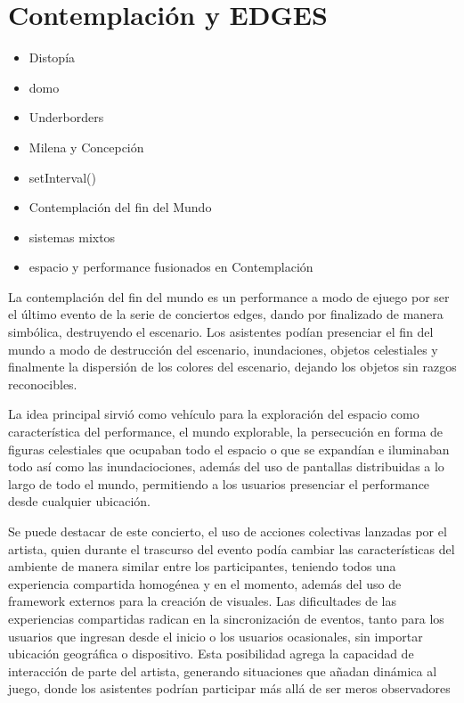 
\section*{Contemplación y EDGES} %

\begin{itemize}
\item Distopía
\item domo 
\item Underborders
\item Milena y Concepción
\item setInterval()
\item Contemplación del fin del Mundo
\item sistemas mixtos
\item espacio y performance fusionados en Contemplación
\end{itemize}


La contemplación del fin del mundo es un performance a modo de ejuego por ser el último evento de la serie de conciertos edges, dando por finalizado de manera simbólica, destruyendo el escenario.
Los asistentes podían presenciar el fin del mundo a modo de destrucción del escenario, inundaciones, objetos celestiales y finalmente la dispersión de los colores del escenario, dejando los objetos sin razgos reconocibles.

La idea principal sirvió como vehículo para la exploración del espacio como característica del performance, el mundo explorable, la persecución en forma de figuras celestiales que ocupaban todo el espacio o que se expandían e iluminaban todo así como las inundaciociones, además del uso de pantallas distribuidas a lo largo de todo el mundo, permitiendo a los usuarios presenciar el performance desde cualquier ubicación.

Se puede destacar de este concierto, el uso de acciones colectivas lanzadas por el artista, quien durante el trascurso del evento podía cambiar las características del ambiente de manera similar entre los participantes, teniendo todos una experiencia compartida homogénea y en el momento, además del uso de framework externos  para la creación de visuales.
Las dificultades de las experiencias compartidas radican en la sincronización de eventos, tanto para los usuarios que ingresan desde el inicio o los usuarios ocasionales, sin importar ubicación geográfica o dispositivo.
Esta posibilidad agrega la capacidad de interacción de parte del artista, generando situaciones que añadan dinámica al juego, donde los asistentes podrían participar más allá de ser meros observadores
